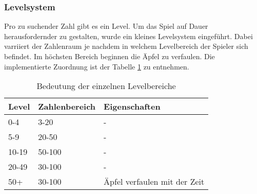 \subsubsection{Levelsystem}
Pro zu suchender Zahl gibt es ein Level. Um das Spiel auf Dauer herausfordernder zu gestalten, wurde ein kleines Levelsystem eingeführt. Dabei varriiert der Zahlenraum je nachdem in welchem Levelbereich der Spieler sich befindet. Im höchsten Bereich beginnen die Äpfel zu verfaulen. Die implementierte Zuordnung ist der Tabelle \ref{tab:levels} zu entnehmen.
\begin{table}[h!]
\centering
\begin{tabular}{|l|l|l|}
\hline
\textbf{Level} & \textbf{Zahlenbereich} & \textbf{Eigenschaften}       \\ \hline
0-4            & 3-20                   & -                            \\ \hline
5-9            & 20-50                  & -                            \\ \hline
10-19          & 50-100                 & -                            \\ \hline
20-49          & 30-100                 & -                            \\ \hline
50+            & 30-100                 & Äpfel verfaulen mit der Zeit \\ \hline
\end{tabular}
\caption{Bedeutung der einzelnen Levelbereiche\label{tab:levels}}
\end{table}
